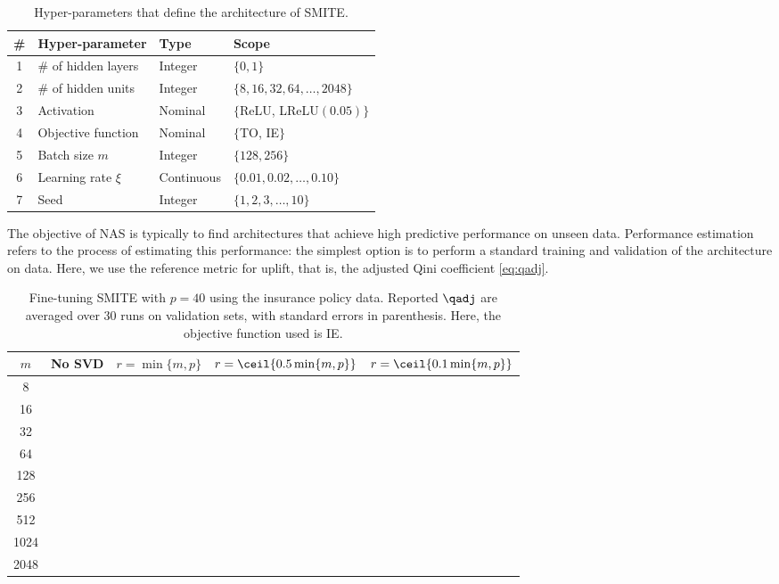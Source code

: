 \begin{table}[htb]
    \caption{Hyper-parameters that define the architecture of SMITE.}
    \centering
    \begin{tabular}{|c||l|l|l|}
         \hline
         \# &  Hyper-parameter & Type & Scope\\
         \hline
         1 & \# of hidden layers & Integer & $\{0,1\}$\\
         2 & \# of hidden units & Integer & $\{8, 16, 32, 64, \ldots, 2048\}$\\
         3 & Activation & Nominal & $\{$ReLU, LReLU$(0.05)\}$\\
         4 & Objective function & Nominal & $\{$TO, IE$\}$ \\
         5 & Batch size $m$ & Integer & $\{128,256\}$ \\
         6 & Learning rate $\xi$ & Continuous & $\{0.01,0.02,\ldots,0.10\}$ \\
         7 & Seed & Integer & $\{1,2,3,\ldots,10\}$ \\
         \hline
    \end{tabular}
    \label{tab:NAS}
\end{table}

The objective of NAS is typically to find architectures that achieve high predictive performance on unseen data. Performance estimation refers to the process of estimating this performance: the simplest option is to perform a standard training and validation of the architecture on data. Here, we use the reference metric for uplift, that is, the adjusted Qini coefficient \eqref{eq:qadj}.


\begin{table}[H]
    \centering
    \caption{Fine-tuning SMITE with $p=40$ using the insurance policy data. Reported $\qadj$ are averaged over $30$ runs on validation sets, with standard errors in parenthesis. Here, the objective function used is IE.}
    \begin{tabular}{|c||l|l|l|l|}
        \hline
        $m$ &  No SVD & $r=\min\{m,p\}$ & $r=\ceil{0.5\min\{m,p\}}$ & $r=\ceil{0.1\min\{m,p\}}$\\
        \hline
        8 & & & & \\
        16 & & & & \\
        32 & & & & \\
        64 & & & & \\
        128 & & & & \\
        256 & & & & \\
        512 & & & & \\
        1024 & & & & \\
        2048 & & & & \\
        \hline
    \end{tabular}
    \label{tab:experiments_low_rank_full_rank}
\end{table}




